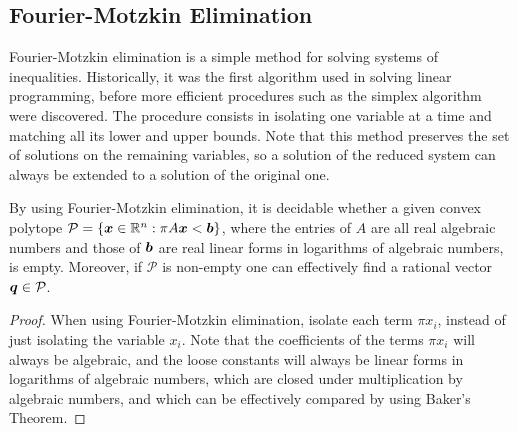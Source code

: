 \subsection{Fourier-Motzkin Elimination}

Fourier-Motzkin elimination is a simple method for solving systems of
inequalities. Historically, it was the first algorithm used in solving
linear programming, before more efficient procedures such as the
simplex algorithm were discovered. The procedure consists in isolating one
variable at a time and matching all its lower and upper bounds. Note
that this method preserves the set of solutions on the remaining
variables, so a solution of the reduced system can always be extended
to a solution of the original one.

\begin{theorem}
\label{thm:fme}
  By using Fourier-Motzkin elimination, it is decidable whether a
  given convex polytope
  $\mathcal{P} = \lbrace \boldsymbol{x} \in \mathbb{R}^{n} : \pi
  A\boldsymbol{x} < \boldsymbol{b} \rbrace$,
  where the entries of $A$ are all real algebraic numbers and
  those of $\boldsymbol{b}$ are real linear forms in logarithms of
  algebraic numbers, is empty.  Moreover, if $\mathcal{P}$ is
  non-empty one can effectively find a rational vector
  $\boldsymbol{q} \in \mathcal{P}$.
\end{theorem}

\begin{proof}
When using Fourier-Motzkin elimination, isolate each term $\pi x_{i}$, instead of just isolating the variable $x_{i}$. Note that the coefficients of the terms $\pi x_{i}$ will always be algebraic, and the loose constants will always be linear forms in logarithms of algebraic numbers, which are closed under multiplication by algebraic numbers, and which can be effectively compared by using Baker's Theorem.
\end{proof}
